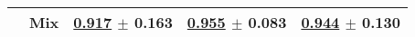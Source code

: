 \begin{tabular}{lllll}
 & Mix & \underline{\textbf{\textcolor[rgb]{0.0000000000,0.5000000000,0}{0.917}}} $\pm$ \textcolor[rgb]{0.6010743070,0.3989256930,0}{0.163} & \underline{\textbf{\textcolor[rgb]{0.0000000000,0.5000000000,0}{0.955}}} $\pm$ \textcolor[rgb]{0.0210320517,0.5000000000,0}{0.083} & \underline{\textcolor[rgb]{0.0851063830,0.5000000000,0}{0.944}} $\pm$ \textcolor[rgb]{0.2193654127,0.5000000000,0}{0.130} \\
\bottomrule
\end{tabular}

